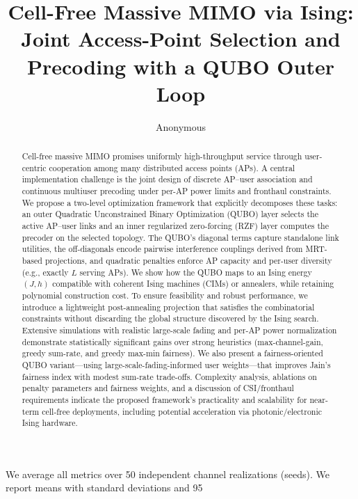 \usepackage{algorithm}
\usepackage{algpseudocode}
\usepackage{booktabs}
\usepackage{siunitx}
\usepackage{cite}
\usepackage{hyperref}
\hypersetup{colorlinks=true, linkcolor=black, citecolor=black, urlcolor=black}

\newcommand{\E}{\mathbb{E}}
\newcommand{\R}{\mathbb{R}}
\newcommand{\1}{\mathbf{1}}



\title{Cell-Free Massive MIMO via Ising: Joint Access-Point Selection and Precoding with a QUBO Outer Loop}

\author{Anonymous}
\maketitle

\begin{abstract}
Cell-free massive MIMO promises uniformly high-throughput service through user-centric cooperation among many distributed access points (APs). A central implementation challenge is the joint design of discrete AP–user association and continuous multiuser precoding under per-AP power limits and fronthaul constraints. We propose a two-level optimization framework that explicitly decomposes these tasks: an outer Quadratic Unconstrained Binary Optimization (QUBO) layer selects the active AP–user links and an inner regularized zero-forcing (RZF) layer computes the precoder on the selected topology. The QUBO’s diagonal terms capture standalone link utilities, the off-diagonals encode pairwise interference couplings derived from MRT-based projections, and quadratic penalties enforce AP capacity and per-user diversity (e.g., exactly $L$ serving APs). We show how the QUBO maps to an Ising energy $(J,h)$ compatible with coherent Ising machines (CIMs) or annealers, while retaining polynomial construction cost. To ensure feasibility and robust performance, we introduce a lightweight post-annealing projection that satisfies the combinatorial constraints without discarding the global structure discovered by the Ising search. Extensive simulations with realistic large-scale fading and per-AP power normalization demonstrate statistically significant gains over strong heuristics (max-channel-gain, greedy sum-rate, and greedy max-min fairness). We also present a fairness-oriented QUBO variant—using large-scale-fading-informed user weights—that improves Jain’s fairness index with modest sum-rate trade-offs. Complexity analysis, ablations on penalty parameters and fairness weights, and a discussion of CSI/fronthaul requirements indicate the proposed framework’s practicality and scalability for near-term cell-free deployments, including potential acceleration via photonic/electronic Ising hardware.
\end{abstract}
We average all metrics over 50 independent channel realizations (seeds). We report means with standard deviations and 95%

